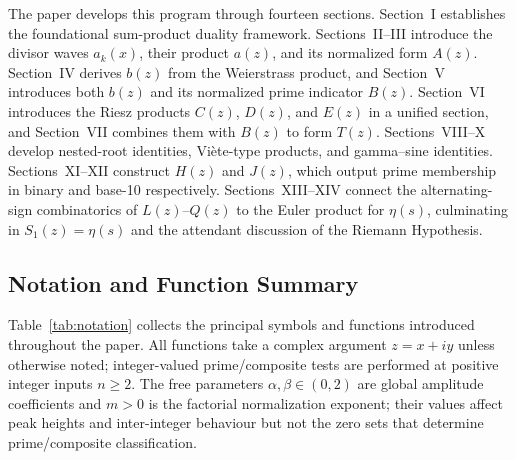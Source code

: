 \documentclass{article}
\begin{document}
The paper develops this program through fourteen sections. Section~I establishes the foundational sum-product duality framework. Sections~II--III introduce the divisor waves $a_k(x)$, their product $a(z)$, and its normalized form $A(z)$. Section~IV derives $b(z)$ from the Weierstrass product, and Section~V introduces both $b(z)$ and its normalized prime indicator $B(z)$. Section~VI introduces the Riesz products $C(z)$, $D(z)$, and $E(z)$ in a unified section, and Section~VII combines them with $B(z)$ to form $T(z)$. Sections~VIII--X develop nested-root identities, Viète-type products, and gamma--sine identities. Sections~XI--XII construct $H(z)$ and $J(z)$, which output prime membership in binary and base-10 respectively. Sections~XIII--XIV connect the alternating-sign combinatorics of $L(z)$--$Q(z)$ to the Euler product for $\eta(s)$, culminating in $S_1(z) = \eta(s)$ and the attendant discussion of the Riemann Hypothesis.

\subsection{Notation and Function Summary}

Table~\ref{tab:notation} collects the principal symbols and functions introduced throughout the paper. All functions take a complex argument $z = x + iy$ unless otherwise noted; integer-valued prime/composite tests are performed at positive integer inputs $n \geq 2$. The free parameters $\alpha, \beta \in (0, 2)$ are global amplitude coefficients and $m > 0$ is the factorial normalization exponent; their values affect peak heights and inter-integer behaviour but not the zero sets that determine prime/composite classification.
\end{document}
